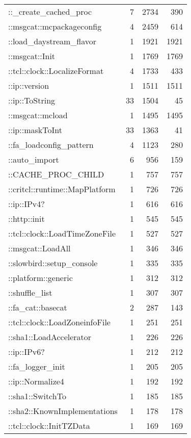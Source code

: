 \documentclass{article}[letter,10pt]
\begin{document}
{{{\begin{longtable}{l r r r}
          ::\_create\_cached\_proc & 7 & 2734 & 390 \\
          ::msgcat::mcpackageconfig & 4 & 2459 & 614 \\
          ::load\_daystream\_flavor & 1 & 1921 & 1921 \\
          ::msgcat::Init & 1 & 1769 & 1769 \\
          ::tcl::clock::LocalizeFormat & 4 & 1733 & 433 \\
          ::ip::version & 1 & 1511 & 1511 \\
          ::ip::ToString & 33 & 1504 & 45 \\
          ::msgcat::mcload & 1 & 1495 & 1495 \\
          ::ip::maskToInt & 33 & 1363 & 41 \\
          ::fa\_loadconfig\_pattern & 4 & 1123 & 280 \\
          ::auto\_import & 6 & 956 & 159 \\
          ::CACHE\_PROC\_CHILD & 1 & 757 & 757 \\
          ::critcl::runtime::MapPlatform & 1 & 726 & 726 \\
          ::ip::IPv4? & 1 & 616 & 616 \\
          ::http::init & 1 & 545 & 545 \\
          ::tcl::clock::LoadTimeZoneFile & 1 & 527 & 527 \\
          ::msgcat::LoadAll & 1 & 346 & 346 \\
          ::slowbird::setup\_console & 1 & 335 & 335 \\
          ::platform::generic & 1 & 312 & 312 \\
          ::shuffle\_list & 1 & 307 & 307 \\
          ::fa\_cat::basecat & 2 & 287 & 143 \\
          ::tcl::clock::LoadZoneinfoFile & 1 & 251 & 251 \\
          ::sha1::LoadAccelerator & 1 & 226 & 226 \\
          ::ip::IPv6? & 1 & 212 & 212 \\
          ::fa\_logger\_init & 1 & 205 & 205 \\
          ::ip::Normalize4 & 1 & 192 & 192 \\
          ::sha1::SwitchTo & 1 & 185 & 185 \\
          ::sha2::KnownImplementations & 1 & 178 & 178 \\
          ::tcl::clock::InitTZData & 1 & 169 & 169 \\

\end{longtable}}}}
\end{document}
